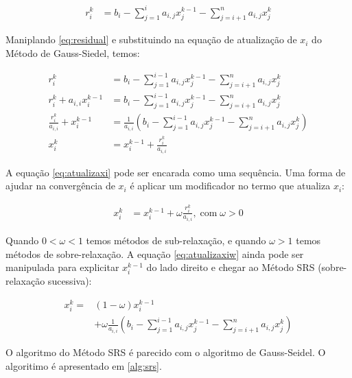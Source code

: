 \documentclass[final,5p]{elsarticle}
\numberwithin{equation}{section}
\begin{document}
        \begin{align}
            r_i^k &= b_i - \sum^{i}_{j=1} a_{i,j} x_j^{k-1} - \sum^{n}_{j=i+1} a_{i,j} x_j^{k} \label{eq:residual}
        \end{align}

        Maniplando \ref{eq:residual} e substituindo na equação de atualização de $x_i$ do Método de Gauss-Siedel, temos:

        \begin{align}
            r_i^k &= b_i - \sum^{i-1}_{j=1} a_{i,j} x_j^{k-1} - \sum^{n}_{j=i+1} a_{i,j} x_j^{k} \nonumber \\
            r_i^k + a_{i,i} x_i^{k-1} &= b_i - \sum^{i-1}_{j=1} a_{i,j} x_j^{k-1} - \sum^{n}_{j=i+1} a_{i,j} x_j^{k} \nonumber \\
            \frac{r_i^k}{a_{i,i}} + x_i^{k-1} &= \frac{1}{a_{i,i}} ( b_i - \sum^{i-1}_{j=1} a_{i,j} x_j^{k-1} - \sum^{n}_{j=i+1} a_{i,j} x_j^{k}) \nonumber \\
            x_i^k &= x_i^{k-1} + \frac{r_i^k}{a_{i,i}} \label{eq:atualizaxi}
        \end{align}

        A equação \ref{eq:atualizaxi} pode ser encarada como uma sequência. Uma forma de ajudar na convergência de ${x_i}$ é aplicar um modificador no termo que atualiza $x_i$:

        \begin{align}
            x_i^k &= x_i^{k-1} + \omega \frac{r_i^k}{a_{i,i}}, \;\text{com} \; \omega > 0 \label{eq:atualizaxiw}
        \end{align}

        Quando $0 < \omega < 1$ temos métodos de sub-relaxação, e quando $\omega > 1$ temos métodos de sobre-relaxação. A equação \ref{eq:atualizaxiw} ainda pode ser manipulada para explicitar $x_i^{k-1}$ do lado direito e chegar ao Método SRS (sobre-relaxação sucessiva):

        \begin{align}
            x_i^k = &(1 - \omega) x_i^{k-1} \nonumber \\
            &+ \omega \frac{1}{a_{i,i}} \left( b_i - \sum^{i-1}_{j=1} a_{i,j} x_j^{k-1} - \sum^{n}_{j=i+1} a_{i,j} x_j^{k} \right) \label{eq:atualizaxisrs}
        \end{align}

        O algoritmo do Método SRS é parecido com o algoritmo de Gauss-Seidel. O algoritimo é apresentado em \ref{alg:srs}.
\end{document}
